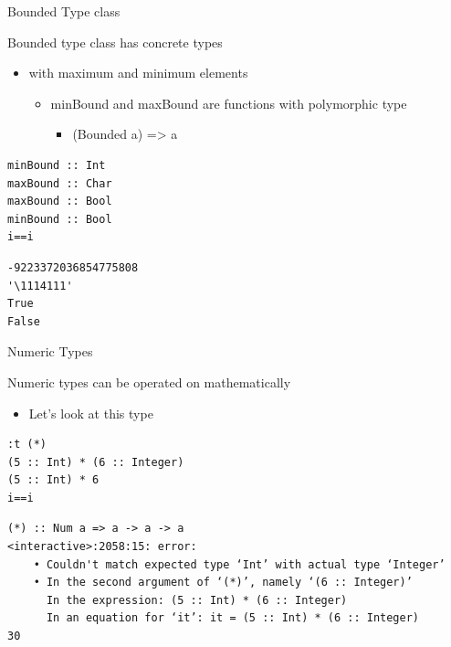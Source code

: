 \documentclass[presetation]{beamer}
\begin{document}
\begin{frame}[fragile,label={sec:org131343c}]{Bounded Type class}
 \begin{block}{Bounded type class has concrete types}
\begin{itemize}
\item with maximum and minimum elements
\begin{itemize}
\item minBound and maxBound are functions with polymorphic type
\begin{itemize}
\item (Bounded a) => a
\end{itemize}
\end{itemize}
\end{itemize}
\begin{verbatim}
minBound :: Int
maxBound :: Char
maxBound :: Bool
minBound :: Bool
i==i
\end{verbatim}

\begin{verbatim}
-9223372036854775808
'\1114111'
True
False
\end{verbatim}
\end{block}
\end{frame}

\begin{frame}[fragile,label={sec:org52b4c22}]{Numeric Types}
 \begin{block}{Numeric types can be operated on mathematically}
\begin{itemize}
\item Let's look at this type
\end{itemize}
\begin{verbatim}
:t (*)
(5 :: Int) * (6 :: Integer)
(5 :: Int) * 6
i==i
\end{verbatim}

\begin{verbatim}
(*) :: Num a => a -> a -> a
<interactive>:2058:15: error:
    • Couldn't match expected type ‘Int’ with actual type ‘Integer’
    • In the second argument of ‘(*)’, namely ‘(6 :: Integer)’
      In the expression: (5 :: Int) * (6 :: Integer)
      In an equation for ‘it’: it = (5 :: Int) * (6 :: Integer)
30
\end{verbatim}
\end{block}
\end{frame}
\end{document}
